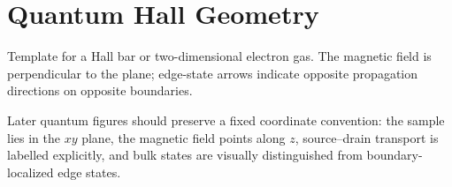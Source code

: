 \section*{Quantum Hall Geometry}

\begin{bookfigure}{Template for a Hall bar or two-dimensional electron gas.
The magnetic field is perpendicular to the plane; edge-state arrows indicate
opposite propagation directions on opposite boundaries.}
\quantumhalltemplate
\end{bookfigure}

\begin{visualguidebox}
Later quantum figures should preserve a fixed coordinate convention:
the sample lies in the $xy$ plane, the magnetic field points along $z$,
source--drain transport is labelled explicitly, and bulk states are visually
distinguished from boundary-localized edge states.
\end{visualguidebox}
